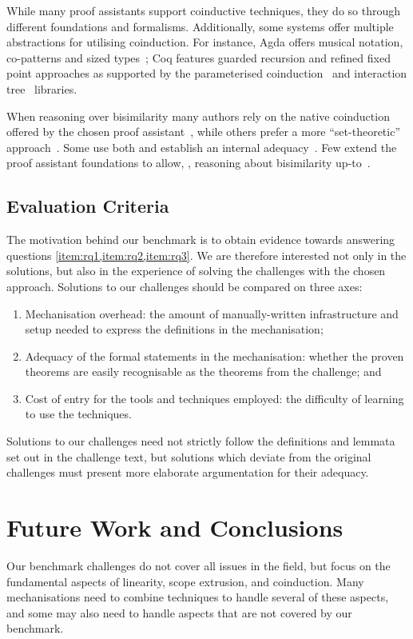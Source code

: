 \documentclass[runningheads]{llncs}
\begin{document}
While many proof assistants support coinductive techniques, they do so
through different foundations and formalisms. %
Additionally, some systems offer multiple abstractions for utilising coinduction.
For instance, Agda offers musical notation, co-patterns and sized types~\cite{Abel2013};
Coq features guarded recursion and refined fixed point approaches as supported by the parameterised coinduction~\cite{Hur2013}
and interaction tree~\cite{Xia2019} libraries.

When reasoning over bisimilarity many authors rely on the native
coinduction offered by the chosen proof
assistant~\cite{Bengtson2016,Kahsai2008,Thiemann2019,Gay2020}, while
others prefer a more ``set-theoretic'' approach~\cite{Hirschkoff1997,Bengtson2009,Maksimovic2015,Pohjola2022}. Some
use both and establish an internal adequacy~\cite{Honsell2001}. Few
extend the proof assistant foundations to allow, \eg, reasoning about
bisimilarity up-to~\cite{ChaudhuriCM15}.

\subsection{Evaluation Criteria}
The motivation behind our benchmark is to obtain evidence towards answering
questions \cref{item:rq1,item:rq2,item:rq3}. We are therefore
interested not only in the solutions, but also in the experience of
solving the challenges with the chosen approach.  Solutions to our
challenges should be compared on three axes:
\begin{enumerate}
\item Mechanisation overhead: the amount of manually-written infrastructure and setup needed to express the definitions in the mechanisation;
\item Adequacy of the formal statements in the mechanisation: whether the proven theorems are easily recognisable as the theorems from the challenge; and
\item Cost of entry for the tools and techniques employed: the difficulty of learning to use the techniques.
\end{enumerate}
Solutions to our challenges need not strictly follow the definitions and lemmata set out in the challenge text, but solutions which deviate from the original challenges must present more elaborate argumentation for their adequacy.

\section{Future Work and Conclusions}\label{sec:going-beyond}
Our benchmark challenges do not cover all issues in the field, but focus on the fundamental aspects of linearity, scope extrusion, and coinduction.
Many mechanisations need to combine techniques to handle several of these aspects, and some may also need to handle aspects that are not covered by our benchmark.
\end{document}
